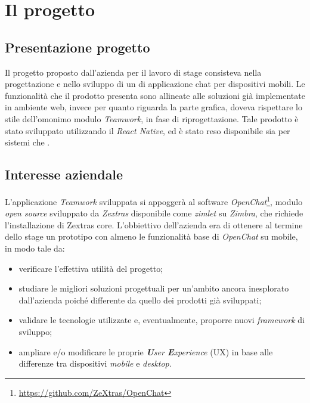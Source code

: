 
\chapter{Il progetto}\label{chap:project}
\section{Presentazione progetto}
Il progetto proposto dall'azienda per il lavoro di stage consisteva nella progettazione e nello sviluppo di un  di applicazione chat per dispositivi mobili. Le funzionalità che il prodotto presenta sono allineate alle soluzioni già implementate in ambiente web, invece per quanto riguarda la parte grafica, doveva rispettare lo stile dell'omonimo modulo \emph{Teamwork}, in fase di riprogettazione. Tale prodotto è stato sviluppato utilizzando il  \emph{React Native}, ed è stato reso disponibile sia per sistemi  che .

\section{Interesse aziendale} \label{sec:intaz}
L'applicazione \emph{Teamwork} sviluppata si appoggerà al software \emph{OpenChat}\footnote{\url{https://github.com/ZeXtras/OpenChat}}, modulo \emph{open source} sviluppato da \emph{Zextras} disponibile come \emph{zimlet} su \emph{Zimbra}, che richiede l'installazione di Zextras core.
L'obbiettivo dell'azienda era di ottenere al termine dello stage un prototipo con almeno le funzionalità base di \emph{OpenChat} su mobile, in modo tale da:
\begin{itemize}
	\item verificare l'effettiva utilità del progetto;
	\item studiare le migliori soluzioni progettuali per un'ambito ancora inesplorato dall'azienda poiché differente da quello dei prodotti già sviluppati;
	\item validare le tecnologie utilizzate e, eventualmente, proporre nuovi \emph{framework} di sviluppo;
	\item ampliare e/o modificare le proprie \emph{\textbf{U}ser \textbf{E}xperience} (\acrshort{UX})  in base alle differenze tra dispositivi \emph{mobile} e \emph{desktop}.
\end{itemize}


